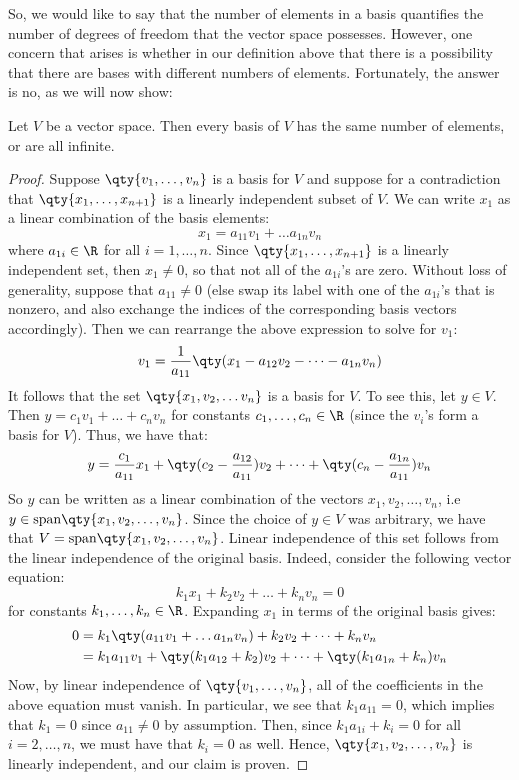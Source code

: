 So, we would like to say that the number of elements in a basis quantifies the number of degrees of freedom that the vector space possesses. However, one concern that arises is whether in our definition above that there is a possibility that there are bases with different numbers of elements. Fortunately, the answer is no, as we will now show:
\begin{theorem}
  \label{thm:dim}
  Let \( V \) be a vector space. Then every basis of \( V \) has the same number of elements, or are all infinite.
\end{theorem}
\begin{proof}
  Suppose \( \qty{v_1,\dots ,v_n} \) is a basis for \( V \) and suppose for a contradiction that \( \qty{x_1,\dots, x_{n+1}} \) is a linearly independent subset of \( V \). We can write \( x_1 \) as a linear combination of the basis elements:
  \[ x_1=a_{11}v_1+\dots a_{1n}v_n \]
  where \( a_{1i}\in\R \) for all \( i=1,\dots, n \). Since \(\qty{x_1,\dots, x_{n+1}}  \) is a linearly independent set, then \( x_1\neq 0 \), so that not all of the \( a_{1i} \)'s are zero. Without loss of generality, suppose that \( a_{11}\neq 0 \) (else swap its label with one of the \( a_{1i} \)'s that is nonzero, and also exchange the indices of the corresponding basis vectors accordingly). Then we can rearrange the above expression to solve for \( v_1 \):
  \[ v_1=\frac{1}{a_{11}}\qty(x_1-a_{12}v_2-\dots-a_{1n}v_n) \]
  It follows that the set \( \qty{x_1,v_2,\dots v_n} \) is a basis for \( V \). To see this, let \( y\in V \). Then \( y=c_1v_1+\dots +c_nv_n \) for constants \( c_1,\dots,c_n\in\R \) (since the \( v_i \)'s form a basis for \( V \)). Thus, we have that:
  \[ y=\frac{c_1}{a_{11}}x_1+\qty(c_2-\frac{a_{12}}{a_{11}})v_2+\dots+\qty(c_n-\frac{a_{1n}}{a_{11}})v_n \]
  So \( y \) can be written as a linear combination of the vectors \( x_1,v_2,\dots,v_n \), i.e \( y\in\text{span}\qty{x_1,v_2,\dots,v_n} \). Since the choice of \( y\in V \) was arbitrary, we have that \( V=\text{span}\qty{x_1,v_2,\dots,v_n} \). Linear independence of this set follows from the linear independence of the original basis. Indeed, consider the following vector equation:
  \[ k_1x_1+k_2v_2+\dots+k_nv_n=0 \]
  for constants \( k_1,\dots,k_n\in\R \). Expanding \( x_1 \) in terms of the original basis gives:
  \begin{align*}
    0&= k_1\qty(a_{11}v_1+\dots a_{1n}v_n)+k_2v_2+\dots+k_nv_n\\
    &= k_1a_{11}v_1+\qty(k_1a_{12}+k_2)v_2+\dots+\qty(k_1a_{1n}+k_n)v_n
  \end{align*}
  Now, by linear independence of \( \qty{v_1,\dots,v_n} \), all of the coefficients in the above equation must vanish. In particular, we see that \( k_1a_{11}=0 \), which implies that \( k_1=0 \) since \( a_{11}\neq 0 \) by assumption. Then, since \( k_1a_{1i}+k_i=0 \) for all \( i=2,\dots, n \), we must have that \( k_i=0 \) as well. Hence, \( \qty{x_1,v_2,\dots, v_n} \) is linearly independent, and our claim is proven.


\end{proof}
